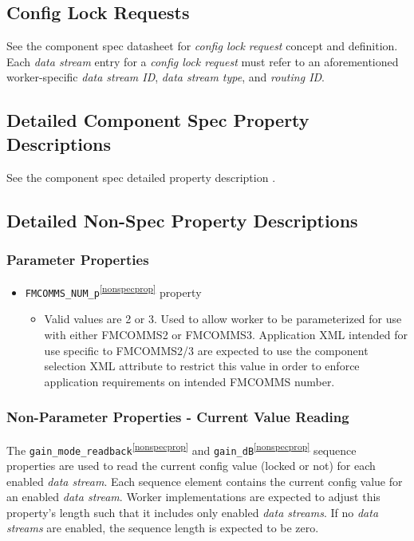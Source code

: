 \documentclass{article}
\begin{document}
  \subsection{Config Lock Requests}
    See the component spec datasheet for
    \textit{config lock request}
    concept and definition\cite{dig_radio_ctrlr_comp_datasheet}.
    Each \textit{data stream} entry for a \textit{config lock request} must
    refer to an
    aforementioned worker-specific \textit{data stream ID},
    \textit{data stream type}, and \textit{routing ID}.


  \subsection{Detailed Component Spec Property Descriptions}

    See the component spec detailed property
    description \cite{dig_radio_ctrlr_comp_datasheet}.

  \subsection{Detailed Non-Spec Property Descriptions}
    \label{sec:detailed_property_description}

    \subsubsection{Parameter Properties}
      \begin{itemize}
        \item \verb+FMCOMMS_NUM_p+\textsuperscript{\ref{nonspecprop}} property
          \begin{itemize}
            \item Valid values are 2 or 3. Used to allow worker to be parameterized
              for use with either FMCOMMS2 or FMCOMMS3. 
              Application XML intended for use specific to FMCOMMS2/3 are expected
              to use the component selection XML attribute to restrict this
              value in order to 
              enforce
              application requirements on intended FMCOMMS number.

          \end{itemize}
        \end{itemize}

    \subsubsection{Non-Parameter Properties - Current Value Reading}
    The
    \verb+gain_mode_readback+\textsuperscript{\ref{nonspecprop}} and
    \verb+gain_dB+\textsuperscript{\ref{nonspecprop}}
    sequence properties are used to read the current config value
    (locked or not) for each enabled \textit{data stream}. Each
    sequence element contains the current config value for an enabled
    \textit{data stream}. Worker implementations are expected to
    adjust this property's
    length such that it includes only enabled \textit{data streams}.
    If no \textit{data streams}
    are enabled, the sequence length is expected to be zero.
\end{document}
